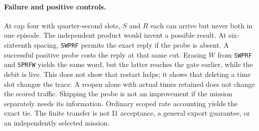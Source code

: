 \documentclass{article}
\begin{document}
\paragraph{Failure and positive controls.} At cap four with
quarter-second slots, \(S\) and \(R\) each can arrive but never both in
one episode. The independent product would invent a possible result.
At six-sixteenth spacing, \texttt{SWPRF} permits the exact reply if
the probe is absent. A successful positive probe costs the reply at
that same cut. Erasing \(W\) from \texttt{SWPRF} and \texttt{SPRFW}
yields the same word, but the latter reaches the gate earlier, while the
debit is live. This does not show that restart helps; it shows that
deleting a time slot changes the trace. A reopen alone with actual times
retained does not change the scored traffic. Skipping the probe is not
an improvement if the mission separately needs its information.
Ordinary scoped rate accounting yields the exact tie. The finite
transfer is not I1 acceptance, a general export guarantee, or an
independently selected mission.
\end{document}
